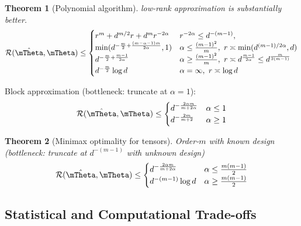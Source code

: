 \documentclass[final,12pt]{colt2020} %
\newtheorem{thm}{Theorem}[section]
\begin{document}
\begin{thm}[Polynomial algorithm] low-rank approximation is substantially better. 
\begin{align}
\tR(\hat \mTheta,\mTheta)\leq
\begin{cases}
r^{m}+d^{m/2}r+d^mr^{-2\alpha}& r^{-2\alpha}\leq d^{-(m-1)},\\
\min(d^{{-{m\over 2}+{(m-\alpha-1)m\over 2\alpha}}},1) &  \alpha\leq {(m-1)^2\over m},\ r\asymp \min(d^{(m-1)/2\alpha},d)\\
d^{-{{m\over 2}+{m-1\over 2\alpha}}}& \alpha\geq {(m-1)^2\over m}, \ r\asymp  d^{m-1\over 2\alpha}\leq d^{m\over 2(m-1)}\\
d^{-{m\over 2}}\log d & \alpha=\infty, \ r\asymp \log d
\end{cases}
\end{align}
\end{thm}

Block approximation (bottleneck: truncate at $\alpha=1$):
\begin{align}
\tR(\hat \mTheta,\mTheta)\leq
\begin{cases}
d^{-{2\alpha m \over m+2\alpha}} & \alpha\leq 1\\
d^{-{2m \over m+2}}& \alpha\geq 1
\end{cases}
\end{align}


\begin{thm}[Minimax optimality for tensors] 
Order-$m$ with known design (bottleneck: truncate at $d^{-(m-1)}$ with unknown design)
\begin{align}
\tR(\hat \mTheta,\mTheta)\leq
\begin{cases}
d^{-{2\alpha m \over m+2\alpha}} & \alpha\leq {m(m-1)\over 2}\\
d^{-{(m-1)}}\log d& \alpha\geq {m(m-1)\over 2}
\end{cases}
\end{align}
\end{thm}

\subsection{Statistical and Computational Trade-offs}


\end{document}
